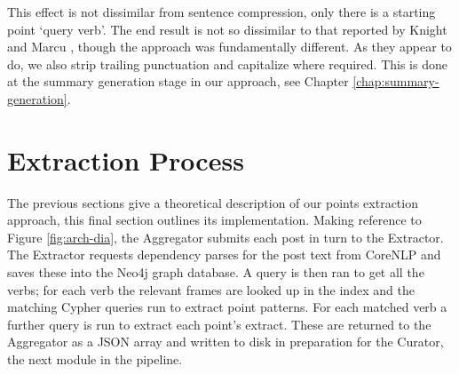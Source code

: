     This effect is not dissimilar from sentence compression, only there is a starting point `query verb'. The end result is not so dissimilar to that reported by Knight and Marcu \cite{knight2000statistics}, though the approach was fundamentally different. As they appear to do, we also strip trailing punctuation and capitalize where required. This is done at the summary generation stage in our approach, see Chapter \ref{chap:summary-generation}.

  \section{Extraction Process}
    The previous sections give a theoretical description of our points extraction approach, this final section outlines its implementation. Making reference to Figure \ref{fig:arch-dia}, the Aggregator submits each post in turn to the Extractor. The Extractor requests dependency parses for the post text from CoreNLP and saves these into the Neo4j graph database. A query is then ran to get all the verbs; for each verb the relevant frames are looked up in the index and the matching Cypher queries run to extract point patterns. For each matched verb a further query is run to extract each point's extract. These are returned to the Aggregator as a JSON array and written to disk in preparation for the Curator, the next module in the pipeline.
